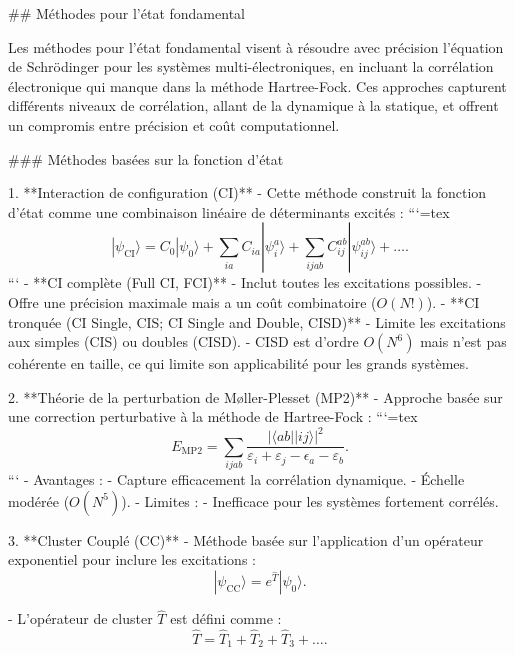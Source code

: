 \documentclass[12pt,a4paper]{report}
\numberwithin{equation}{section}
\numberwithin{figure}{section}
\numberwithin{table}{section}
\begin{document}
\begin{markdown}
## Méthodes pour l'état fondamental

Les méthodes pour l'état fondamental visent à résoudre avec précision l'équation de Schrödinger pour les systèmes multi-électroniques, en incluant la corrélation électronique qui manque dans la méthode Hartree-Fock. Ces approches capturent différents niveaux de corrélation, allant de la dynamique à la statique, et offrent un compromis entre précision et coût computationnel.

### Méthodes basées sur la fonction d'état

1. **Interaction de configuration (CI)**
   - Cette méthode construit la fonction d'état comme une combinaison linéaire de déterminants excités :
```{=tex}
\begin{equation}
|\psi_{\text{CI}}\rangle = C_0 |\psi_0\rangle + \sum_{ia} C_{ia} |\psi_i^a\rangle + \sum_{ijab} C_{ij}^{ab} |\psi_{ij}^{ab}\rangle + \dots .
\end{equation}
```
   - **CI complète (Full CI, FCI)**
     - Inclut toutes les excitations possibles.
     - Offre une précision maximale mais a un coût combinatoire ($O(N!)$).
   - **CI tronquée (CI Single, CIS; CI Single and Double, CISD)** 
     - Limite les excitations aux simples (CIS) ou doubles (CISD).
     - CISD est d'ordre $O(N^6)$ mais n'est pas cohérente en taille, ce qui limite son applicabilité pour les grands systèmes.

2. **Théorie de la perturbation de Møller-Plesset (MP2)**
   - Approche basée sur une correction perturbative à la méthode de Hartree-Fock :
```{=tex}
\begin{equation}
E_{\text{MP2}} = \sum_{ijab} \frac{|\langle ab || ij \rangle|^2}{\varepsilon_i + \varepsilon_j - \epsilon_a - \varepsilon_b} .
\end{equation}
```
   - Avantages :
     - Capture efficacement la corrélation dynamique.
     - Échelle modérée ($O(N^5)$).
   - Limites :
     - Inefficace pour les systèmes fortement corrélés.

3. **Cluster Couplé (CC)**
   - Méthode basée sur l'application d'un opérateur exponentiel pour inclure les excitations :
\begin{equation}
|\psi_{\text{CC}}\rangle = e^{\hat{T}} |\psi_0\rangle .
\end{equation}

   - L'opérateur de cluster $\hat{T}$ est défini comme :
\begin{equation}
\hat{T} = \hat{T}_1 + \hat{T}_2 + \hat{T}_3 + \dots .
\end{equation}


\end{markdown}
\end{document}
